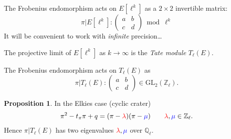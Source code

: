 \documentclass[10pt,a4paper]{beamer}
\theoremstyle{plain}
\theoremstyle{definition}
\theoremstyle{definition}
\theoremstyle{definition}
\newtheorem{prop}[thm]{Proposition}
\theoremstyle{definition}
\theoremstyle{remark}
\theoremstyle{remark}
\begin{document}
\begin{frame}
The Frobenius endomorphism acts on $E[\ell^k]$ as a $2\times2$ invertible matrix:
\[
\pi|E[\ell^k]:
\begin{pmatrix}
a & b \\
c & d 
\end{pmatrix} \bmod{\ell^k}
\]
\pause
It will be convenient to work with \emph{infinite} precision\dots

The projective limit of $E[\ell^k]$ as $k\to\infty$ is the \textit{Tate module} $T_\ell(E)$.

The Frobenius endomorphism acts on $T_\ell(E)$ as
\[
\pi|T_\ell(E) : \begin{pmatrix}
a & b \\
c & d  
\end{pmatrix} \in \mathrm{GL}_2(\mathbb{Z}_\ell).
\]

\begin{prop}
    In the Elkies case (cyclic crater)
    \[\pi^2 - t_\pi\pi + q = (\pi-{\color{red}\lambda})(\pi-{\color{blue}\mu})
    \qquad {\color{red}\lambda},{\color{blue}\mu}\in\mathbb{Z}_\ell.
    \]
    Hence $\pi|T_\ell(E)$ has two eigenvalues ${\color{red}\lambda},{\color{blue}\mu}$ over $\mathbb{Q}_\ell$.
\end{prop}
\end{frame}
\end{document}

